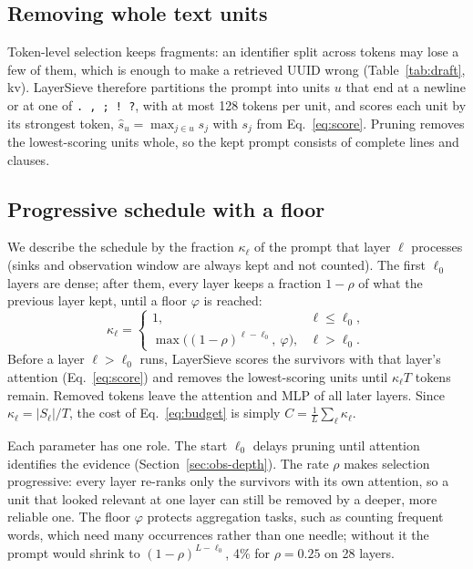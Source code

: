 \documentclass[10pt,conference]{IEEEtran}
\begin{document}
\subsection{Removing whole text units}

Token-level selection keeps fragments: an identifier split across tokens may lose a few of them, which is enough to make a retrieved UUID wrong (Table~\ref{tab:draft}, kv). LayerSieve therefore partitions the prompt into units $u$ that end at a newline or at one of \texttt{. , ; ! ?}, with at most 128 tokens per unit, and scores each unit by its strongest token, $\hat s_u=\max_{j\in u}s_j$ with $s_j$ from Eq.~\eqref{eq:score}. Pruning removes the lowest-scoring units whole, so the kept prompt consists of complete lines and clauses.

\subsection{Progressive schedule with a floor}

We describe the schedule by the fraction $\kappa_\ell$ of the prompt that layer $\ell$ processes (sinks and observation window are always kept and not counted). The first $\ell_0$ layers are dense; after them, every layer keeps a fraction $1-\rho$ of what the previous layer kept, until a floor $\varphi$ is reached:
\begin{equation}
\kappa_\ell=\begin{cases}1, & \ell\le\ell_0,\\ \max\big((1-\rho)^{\ell-\ell_0},\ \varphi\big), & \ell>\ell_0.\end{cases}
\label{eq:sched}
\end{equation}
Before a layer $\ell>\ell_0$ runs, LayerSieve scores the survivors with that layer's attention (Eq.~\eqref{eq:score}) and removes the lowest-scoring units until $\kappa_\ell T$ tokens remain. Removed tokens leave the attention and MLP of all later layers. Since $\kappa_\ell=|S_\ell|/T$, the cost of Eq.~\eqref{eq:budget} is simply $C=\frac{1}{L}\sum_\ell\kappa_\ell$.

Each parameter has one role. The start $\ell_0$ delays pruning until attention identifies the evidence (Section~\ref{sec:obs-depth}). The rate $\rho$ makes selection progressive: every layer re-ranks only the survivors with its own attention, so a unit that looked relevant at one layer can still be removed by a deeper, more reliable one. The floor $\varphi$ protects aggregation tasks, such as counting frequent words, which need many occurrences rather than one needle; without it the prompt would shrink to $(1-\rho)^{L-\ell_0}$, 4\% for $\rho=0.25$ on 28 layers.
\end{document}
